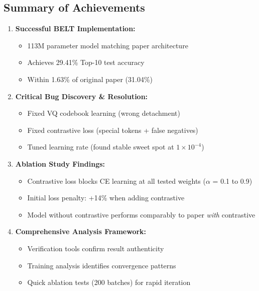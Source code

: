 \documentclass[12pt,a4paper]{article}
\begin{document}
\subsection{Summary of Achievements}

\begin{enumerate}
    \item \textbf{Successful BELT Implementation:}
    \begin{itemize}
        \item 113M parameter model matching paper architecture
        \item Achieves 29.41\% Top-10 test accuracy
        \item Within 1.63\% of original paper (31.04\%)
    \end{itemize}
    
    \item \textbf{Critical Bug Discovery \& Resolution:}
    \begin{itemize}
        \item Fixed VQ codebook learning (wrong detachment)
        \item Fixed contrastive loss (special tokens + false negatives)
        \item Tuned learning rate (found stable sweet spot at $1 \times 10^{-4}$)
    \end{itemize}
    
    \item \textbf{Ablation Study Findings:}
    \begin{itemize}
        \item Contrastive loss blocks CE learning at all tested weights ($\alpha$ = 0.1 to 0.9)
        \item Initial loss penalty: +14\% when adding contrastive
        \item Model without contrastive performs comparably to paper \textit{with} contrastive
    \end{itemize}
    
    \item \textbf{Comprehensive Analysis Framework:}
    \begin{itemize}
        \item Verification tools confirm result authenticity
        \item Training analysis identifies convergence patterns
        \item Quick ablation tests (200 batches) for rapid iteration
    \end{itemize}
\end{enumerate}
\end{document}
